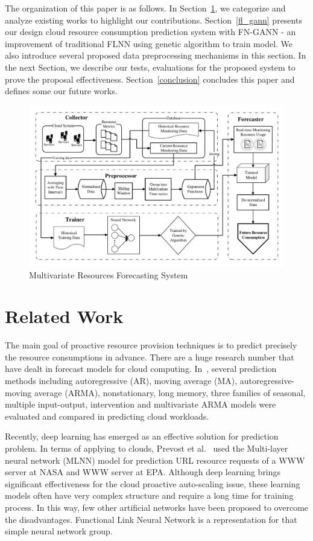 \documentclass[conference]{IEEEtran}
\begin{document}
The organization of this paper is as follows. In Section~\ref{related_work}, we categorize and analyze existing works to highlight our contributions. Section~\ref{fl_gann} presents our design cloud resource consumption prediction system with FN-GANN - an improvement of traditional FLNN using genetic algorithm to train model. We also introduce several proposed data preprocessing mechanisms in this section. In the next Section, we describe our tests, evaluations for the proposed system to prove the proposal effectiveness. Section~\ref{conclusion} concludes this paper and defines some our future works.

\begin{figure}[h]
	\centerline{\includegraphics[width=0.7\textwidth =0.1cm 0.1cm 0.1cm 0.1cm, clip]{images/FLGANN_system.pdf}}
	\caption{Multivariate Resources Forecasting System}
	\label{FLGANN_system}
\end{figure}
     
\section{Related Work}
\label{related_work}

The main goal of proactive resource provision techniques is to predict precisely the resource consumptions in advance. There are a huge research number that have dealt in forecast models for cloud computing. In~\cite{ref_hipel}, several prediction methods including autoregressive (AR), moving average (MA), autoregressive-moving average (ARMA), nonstationary, long memory, three families of seasonal, multiple input-output, intervention and multivariate ARMA models were evaluated and compared in predicting cloud workloads. 

Recently, deep learning has emerged as an effective solution for prediction problem. In terms of applying to clouds, Prevost et al.~\cite{ref_prevost} used the Multi-layer neural network (MLNN) model for prediction URL resource requests of a WWW server at NASA and WWW server at EPA. Although deep learning brings significant effectiveness for the cloud proactive auto-scaling issue, these learning models often have very complex structure and require a long time for training process. In this way, few other artificial networks have been proposed to overcome the disadvantages. Functional Link Neural Network is a representation for that simple neural network group.
\end{document}
